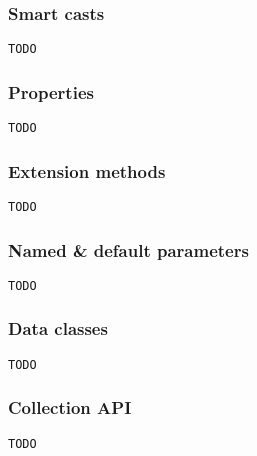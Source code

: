 \begin{frame}[fragile] \frametitle{Smart casts}
\begin{lstlisting}
TODO
\end{lstlisting}
\end{frame}


\begin{frame}[fragile] \frametitle{Properties}
\begin{lstlisting}
TODO
\end{lstlisting}
\end{frame}


\begin{frame}[fragile] \frametitle{Extension methods}
\begin{lstlisting}
TODO
\end{lstlisting}
\end{frame}


\begin{frame}[fragile] \frametitle{Named \& default parameters}
\begin{lstlisting}
TODO
\end{lstlisting}
\end{frame}


\begin{frame}[fragile] \frametitle{Data classes}
\begin{lstlisting}
TODO
\end{lstlisting}
\end{frame}


\begin{frame}[fragile] \frametitle{Collection API}
\begin{lstlisting}
TODO
\end{lstlisting}
\end{frame}


